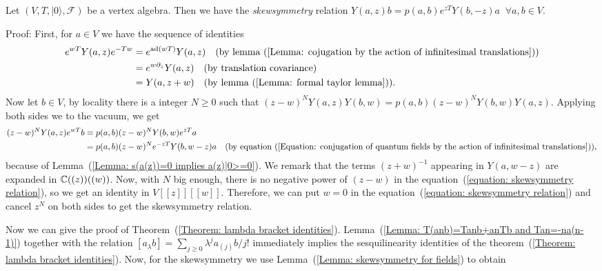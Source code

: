 \begin{dang}
    \begin{lemma}\label{Lemma: skewsymmetry for fields}\cite{de2006finite}
        Let $(V,T,|0\rangle,\mathcal{F})$ be a vertex algebra. Then we have the \textit{skewsymmetry} relation $Y(a,z)b=p(a,b)e^{zT}Y(b,-z)a\;\;\forall a,b\in V$.
    \end{lemma}
\end{dang}
Proof: First, for $a\in V$ we have the sequence of identities
\begin{equation}\label{Equation: conjugation of quantum fields by the action of infinitesimal translations}
    \begin{split}
        e^{wT}Y(a,z)e^{-Tw}&= e^{\text{ad}(wT)}Y(a,z)\quad(\text{by lemma~(\ref{Lemma: cojugation by the action of infinitesimal translations})})\\
        &=e^{w\partial_z}Y(a,z)\quad(\text{by translation covariance})\\
        &=Y(a,z+w)\quad(\text{by lemma~(\ref{Lemma: formal taylor lemma})}).
    \end{split}
\end{equation}
Now let $b\in V$, by locality there is a integer $N\geq0$ such that $(z-w)^NY(a,z)Y(b,w)=p(a,b)(z-w)^NY(b,w)Y(a,z)$. Applying  both sides we to the vacuum, we get
\begin{equation}\label{equation: skewsymmetry relation}
\begin{split}
      (z-w)^NY(a,z)e^{wT}b&=p(a,b)(z-w)^NY(b,w)e^{zT}a\\
      &=p(a,b)(z-w)^Ne^{-zT}Y(b,w-z)a\quad(\text{by equation~(\ref{Equation: conjugation of quantum fields by the action of infinitesimal translations})}),
\end{split}
\end{equation}
because of Lemma~(\ref{Lemma: s(a(z))=0 implies a(z)|0>=0}). We remark that the terms $(z+w)^{-1}$ appearing in $Y(a,w-z)$ are expanded in $\mathbb{C}((z))((w))$. Now, with $N$ big enough, there is no negative power of $(z-w)$ in the equation~(\ref{equation: skewsymmetry relation}), so we get an identity in $V[[z]][[w]]$. Therefore, we can put $w=0$ in the equation~(\ref{equation: skewsymmetry relation}) and cancel $z^N$ on both sides to get the skewsymmetry relation.\par
Now we can give the proof of Theorem~(\ref{Theorem: lambda bracket identities}). Lemma~(\ref{Lemma: T(anb)=Tanb+anTb and Tan=-na(n-1)}) together with the relation $[a_\lambda b]=\sum_{j\geq0}\lambda^ja_{(j)}b/j!$ immediately implies the sesquilinearity identities of the theorem~(\ref{Theorem: lambda bracket identities}). Now, for the skewsymmetry we use Lemma~(\ref{Lemma: skewsymmetry for fields}) to obtain
